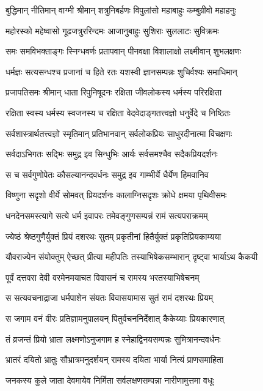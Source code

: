 \twolineshloka
{बुद्धिमान् नीतिमान् वाग्मी श्रीमान् शत्रुनिबर्हणः}
{विपुलांसो महाबाहुः कम्बुग्रीवो महाहनुः}%

\twolineshloka
{महोरस्को महेष्वासो गूढजत्रुररिन्दमः}
{आजानुबाहुः सुशिराः सुललाटः सुविक्रमः}%

\twolineshloka
{समः समविभक्ताङ्गः स्निग्धवर्णः प्रतापवान्}
{पीनवक्षा विशालाक्षो लक्ष्मीवान् शुभलक्षणः}%

\twolineshloka
{धर्मज्ञः सत्यसन्धश्च प्रजानां च हिते रतः}
{यशस्वी ज्ञानसम्पन्नः शुचिर्वश्यः समाधिमान्}%

\twolineshloka
{प्रजापतिसमः श्रीमान् धाता रिपुनिषूदनः}
{रक्षिता जीवलोकस्य धर्मस्य परिरक्षिता}%

\twolineshloka
{रक्षिता स्वस्य धर्मस्य स्वजनस्य च रक्षिता}
{वेदवेदाङ्गतत्त्वज्ञो धनुर्वेदे च निष्ठितः}%

\twolineshloka
{सर्वशास्त्रार्थतत्त्वज्ञो स्मृतिमान् प्रतिभानवान्}
{सर्वलोकप्रियः साधुरदीनात्मा विचक्षणः}%

\twolineshloka
{सर्वदाऽभिगतः सद्भिः समुद्र इव सिन्धुभिः}
{आर्यः सर्वसमश्चैव सदैकप्रियदर्शनः}%

\twolineshloka
{स च सर्वगुणोपेतः कौसल्यानन्दवर्धनः}
{समुद्र इव गाम्भीर्ये धैर्येण हिमवानिव}%

\twolineshloka
{विष्णुना सदृशो वीर्ये सोमवत् प्रियदर्शनः}
{कालाग्निसदृशः क्रोधे क्षमया पृथिवीसमः}%

\twolineshloka
{धनदेनसमस्त्यागे सत्ये धर्म इवापरः}
{तमेवङ्गुणसम्पन्नं रामं सत्यपराक्रमम्}%

\twolineshloka
{ज्येष्ठं श्रेष्ठगुणैर्युक्तं प्रियं दशरथः सुतम्}
{प्रकृतीनां हितैर्युक्तं प्रकृतिप्रियकाम्यया}%

\twolineshloka
{यौवराज्येन संयोक्तुम् ऐच्छत् प्रीत्या महीपतिः}
{तस्याभिषेकसम्भारान् दृष्ट्वा भार्याऽथ कैकयी}%

\twolineshloka
{पूर्वं दत्तवरा देवी वरमेनमयाचत}
{विवासनं च रामस्य भरतस्याभिषेचनम्}%

\twolineshloka
{स सत्यवचनाद्राजा धर्मपाशेन संयतः}
{विवासयामास सुतं रामं दशरथः प्रियम्}%

\twolineshloka
{स जगाम वनं वीरः प्रतिज्ञामनुपालयन्}
{पितुर्वचननिर्देशात् कैकेय्याः प्रियकारणात्}%

\twolineshloka
{तं व्रजन्तं प्रियो भ्राता लक्ष्मणोऽनुजगाम ह}
{स्नेहाद्विनयसम्पन्नः सुमित्रानन्दवर्धनः}%

\twolineshloka
{भ्रातरं दयितो भ्रातुः सौभ्रात्रमनुदर्शयन्}
{रामस्य दयिता भार्या नित्यं प्राणसमाहिता}%

\twolineshloka
{जनकस्य कुले जाता देवमायेव निर्मिता}
{सर्वलक्षणसम्पन्ना नारीणामुत्तमा वधूः}%

